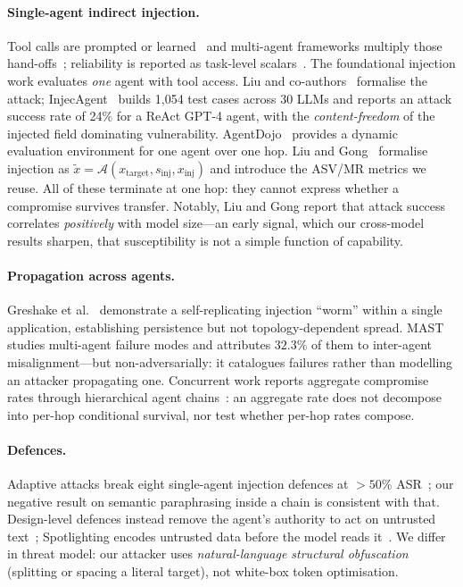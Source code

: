 \documentclass[sigconf,anonymous]{aamas}
\begin{document}
\paragraph{Single-agent indirect injection.}
Tool calls are prompted or learned~\cite{Yao2023ReAct,Schick2023Toolformer,Shinn2023Reflexion}
and multi-agent frameworks multiply those hand-offs~\cite{Chen2024AgentVerse,Du2024MultiagentDebate};
reliability is reported as task-level scalars~\cite{Liu2024AgentBench,Jimenez2024SWEBench,Andriushchenko2025AgentHarm,Zhang2025ASB}.
The foundational injection work evaluates \emph{one} agent with tool access.
Liu and co-authors~\cite{Liu2023PromptInjection} formalise the attack;
InjecAgent~\cite{Zhan2024InjecAgent} builds 1{,}054 test cases across 30 LLMs and
reports an attack success rate of 24\% for a ReAct GPT-4 agent, with the
\emph{content-freedom} of the injected field dominating vulnerability.
AgentDojo~\cite{Debenedetti2024AgentDojo} provides a dynamic evaluation
environment for one agent over one hop. Liu and Gong~\cite{LiuGong2024} formalise
injection as $\tilde{x} = \mathcal{A}(x_{\mathrm{target}}, s_{\mathrm{inj}},
x_{\mathrm{inj}})$ and introduce the ASV/MR metrics we reuse. All of these
terminate at one hop: they cannot express whether a compromise survives transfer.
Notably, Liu and Gong report that attack success correlates \emph{positively} with
model size---an early signal, which our cross-model results sharpen, that
susceptibility is not a simple function of capability.

\paragraph{Propagation across agents.}
Greshake et al.~\cite{Greshake2023} demonstrate a self-replicating injection
``worm'' within a single application, establishing persistence but not
topology-dependent spread. MAST~\cite{Cemri2025MAST} studies multi-agent failure
modes and attributes $32.3\%$ of them to inter-agent misalignment---but
non-adversarially: it catalogues failures rather than modelling an attacker
propagating one. Concurrent work reports aggregate compromise rates through hierarchical agent
chains~\cite{CII2026}: an aggregate rate does not decompose into per-hop
conditional survival, nor test whether per-hop rates compose.

\paragraph{Defences.}
Adaptive attacks break eight single-agent injection defences at
$>50\%$ ASR~\cite{Zhan2025Adaptive}; our negative result on semantic paraphrasing
inside a chain is consistent with that. Design-level defences instead
remove the agent's authority to act on untrusted text~\cite{Debenedetti2025CaMeL};
Spotlighting encodes untrusted data before the model reads
it~\cite{Hines2024Spotlighting}. We differ in threat model: our attacker uses
\emph{natural-language structural obfuscation} (splitting or spacing a literal
target), not white-box token optimisation.
\end{document}
